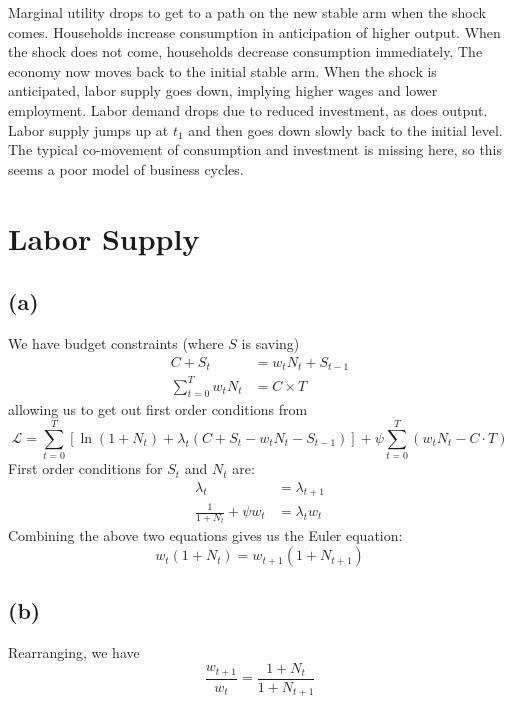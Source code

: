 \documentclass[11pt]{amsart}
\begin{document}
Marginal utility drops to get to a path on the new stable arm when the shock comes. 
Households increase consumption in anticipation of higher output.
When the shock does not come, households decrease consumption immediately. 
The economy now moves back to the initial stable arm.
When the shock is anticipated, labor supply goes down, implying higher wages and lower employment. 
Labor demand drops due to reduced investment, as does output. 
Labor supply jumps up at $t_1$ and then goes down slowly back to the initial level.
The typical co-movement of consumption and investment is missing here, so this seems a poor model of business cycles.





\section{Labor Supply}

\subsection*{(a)}
We have budget constraints (where $S$ is saving)
	\begin{align*}
	C + S_t &= w_t N_t + S_{t-1} \\
	\sum_{t=0}^{T} w_t N_t & = C \times T
	\end{align*} 
allowing us to get out first order conditions from
	\begin{equation*}
	\mathcal{L} = \sum_{t=0}^{T}  \left[ \ln (1+ N_t) + \lambda_t \left(C + S_t - w_t N_t - S_{t-1} \right) \right] + \psi \sum_{t=0}^{T} \left( w_t N_t - C \cdot T\right)  
	\end{equation*}
    First order conditions for $S_t$ and $N_t$ are: 
    \begin{align*}
    \lambda_t &= \lambda_{t+1} \\
    \frac{1}{1+N_t} + \psi w_t &= \lambda_t w_t 
    \end{align*}
    Combining the above two equations gives us the Euler equation: 
    \begin{equation*}
    w_t (1+ N_t) = w_{t+1} (1+N_{t+1})
    \end{equation*}

\subsection*{(b)}
Rearranging, we have
    \begin{equation*}
    \frac{w_{t+1}}{w_t} = \frac{1+N_t}{1+ N_{t+1}} 
    \end{equation*}
\end{document}
